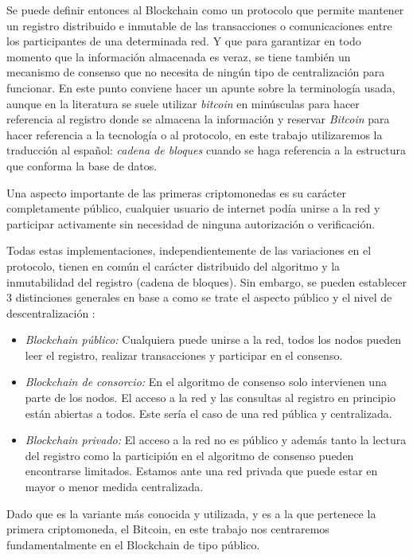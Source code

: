 Se puede definir entonces al Blockchain como un protocolo que permite mantener un registro distribuido e inmutable de las transacciones o comunicaciones entre los participantes de una determinada red. Y que para garantizar en todo momento que la información almacenada es veraz, se tiene también un mecanismo de consenso que no necesita de ningún tipo de centralización para funcionar. En este punto conviene hacer un apunte sobre la terminología usada, aunque en la literatura se suele utilizar \textit{bitcoin} en minúsculas para hacer referencia al registro donde se almacena la información y reservar \textit{Bitcoin} para hacer referencia a la tecnología o al protocolo, en este trabajo utilizaremos la traducción al español: \textit{cadena de bloques} cuando se haga referencia a la estructura que conforma la base de datos.

Una aspecto importante de las primeras criptomonedas es su carácter completamente público, cualquier usuario de internet podía unirse a la red y participar activamente sin necesidad de ninguna autorización o verificación. 

Todas estas implementaciones, independientemente de las variaciones en el protocolo, tienen en común el carácter distribuido del algoritmo y la inmutabilidad del registro (cadena de bloques). Sin embargo, se pueden establecer 3 distinciones generales en base a como se trate el aspecto público y el nivel de  descentralización \citep{type_blockchain}:
\begin{itemize}
\item \textit{Blockchain público:} Cualquiera puede unirse a la red, todos los nodos pueden leer el registro, realizar transacciones y participar en el consenso.
\item \textit{Blockchain de consorcio:} En el algoritmo de consenso solo intervienen una parte de los nodos. El acceso a la red y las consultas al registro en principio están abiertas a todos. Este sería el caso de una red pública y centralizada.
\item \textit{Blockchain privado:} El acceso a la red no es público y además tanto la lectura del registro como la participión en el algoritmo de consenso pueden encontrarse limitados. Estamos ante una red privada que puede estar en mayor o menor medida centralizada.
\end{itemize}

Dado que es la variante más conocida y utilizada, y es a la que pertenece la primera criptomoneda, el Bitcoin, en este trabajo nos centraremos fundamentalmente en el Blockchain de tipo público. 



